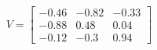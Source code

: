 \documentclass[preview]{standalone}
\begin{document}
\begin{align*}
V=\left[\begin{matrix}-0.46&-0.82&-0.33\\-0.88&0.48&0.04\\-0.12&-0.3&0.94\end{matrix}\right]
\end{align*}
\end{document}

